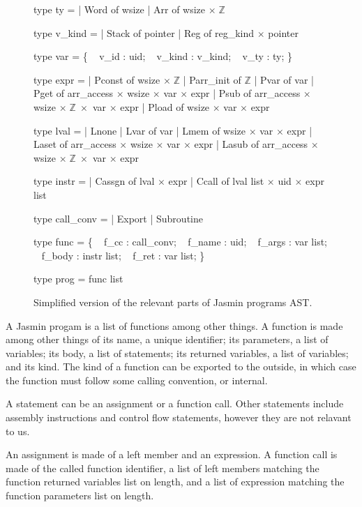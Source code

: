\documentclass{article}
\newcommand\setZ{\mathbb{Z}}
\begin{document}
\begin{figure}
\obeylines\obeyspaces\ttfamily%
type ty =
| Word of wsize
| Arr  of wsize \(\times\;\setZ\)

type v\_kind =
| Stack of pointer
| Reg   of reg\_kind \(\times\) pointer

type var = \{
~ v\_id   : uid;
~ v\_kind : v\_kind;
~ v\_ty   : ty;
\}

type expr =
| Pconst of wsize \(\times\;\setZ\)
| Parr\_init of \(\setZ\)
| Pvar   of var
| Pget   of arr\_access \(\times\) wsize \(\times\) var \(\times\) expr
| Psub   of arr\_access \(\times\) wsize \(\times\;\setZ\;\times\) var \(\times\) expr
| Pload  of wsize \(\times\) var \(\times\) expr

type lval =
| Lnone
| Lvar  of var
| Lmem  of wsize \(\times\) var \(\times\) expr
| Laset of arr\_access \(\times\) wsize \(\times\) var \(\times\) expr
| Lasub of arr\_access \(\times\) wsize \(\times\;\setZ\;\times\) var \(\times\) expr

type instr =
| Cassgn of lval \(\times\) expr
| Ccall  of lval list \(\times\) uid \(\times\) expr list

type call\_conv =
| Export
| Subroutine

type func = \{
~ f\_cc   : call\_conv;
~ f\_name : uid;
~ f\_args : var list;
~ f\_body : instr list;
~ f\_ret  : var list;
\}

type prog = func list
\normalfont%
\caption{Simplified version of the relevant parts of Jasmin programs AST.}
\end{figure}

A Jasmin progam is a list of functions among other things. A function is made
among other things of its name, a unique identifier; its parameters, a list of
variables; its body, a list of statements; its returned variables, a list of
variables; and its kind. The kind of a function can be exported to the outside,
in which case the function must follow some calling convention, or internal.

\smallskip

A statement can be an assignment or a function call.
Other statements include assembly instructions and control flow statements,
however they are not relavant to us.

An assignment is made of a left member and an expression. A function call is
made of the called function identifier, a list of left members matching the
function returned variables list on length, and a list of expression matching
the function parameters list on length.
\end{document}
